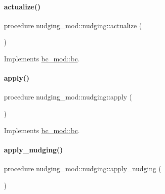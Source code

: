 \paragraph{\texorpdfstring{actualize()}{actualize()}}
{\footnotesize\ttfamily procedure nudging\+\_\+mod\+::nudging\+::actualize (\begin{DoxyParamCaption}{ }\end{DoxyParamCaption})\hspace{0.3cm}{\ttfamily [private]}}



Implements \mbox{\hyperlink{structbc__mod_1_1bc_a15503494f181d4090774d948cecdce48}{bc\+\_\+mod\+::bc}}.

\mbox{\label{structnudging__mod_1_1nudging_ad5101760abbec7a50024ecc3435eda49}} 
\paragraph{\texorpdfstring{apply()}{apply()}}
{\footnotesize\ttfamily procedure nudging\+\_\+mod\+::nudging\+::apply (\begin{DoxyParamCaption}{ }\end{DoxyParamCaption})\hspace{0.3cm}{\ttfamily [private]}}



Implements \mbox{\hyperlink{structbc__mod_1_1bc_a628eafc79842d1d1d62e043aedf49aa0}{bc\+\_\+mod\+::bc}}.

\mbox{\label{structnudging__mod_1_1nudging_a232a6666abdc760493681d65cf8eb8e0}} 
\paragraph{\texorpdfstring{apply\+\_\+nudging()}{apply\_nudging()}}
{\footnotesize\ttfamily procedure nudging\+\_\+mod\+::nudging\+::apply\+\_\+nudging (\begin{DoxyParamCaption}{ }\end{DoxyParamCaption})\hspace{0.3cm}{\ttfamily [private]}}



